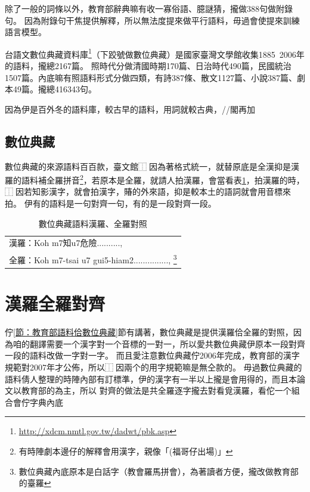 \documentclass[final,oneside,onecolumn,12pt,a4paper]{book}%
\begin{document}
除了一般的詞條以外，教育部辭典嘛有收一寡俗語、臆謎猜，攏做388句做附錄句。
因為附錄句干焦提供解釋，所以無法度提來做平行語料，毋過會使提來訓練語言模型。

台語文數位典藏資料庫\footnote{\url{http://xdcm.nmtl.gov.tw/dadwt/pbk.asp}}（下跤號做數位典藏）是國家臺灣文學館收集1885~2006年的語料，攏總2167篇。
照時代分做清國時期170篇、日治時代490篇，民國統治1507篇。內底嘛有照語料形式分做四類，有詩387條、散文1127篇、小說387篇、劇本49篇。攏總416343句。

因為伊是百外冬的語料庫，較古早的語料，用詞就較古典，//閣再加

\subsection{數位典藏}
\label{節：數位典藏}
數位典藏的來源語料百百款，臺文館⿰因為著格式統一，就替原底是全漢抑是漢羅的語料補全羅拼音\footnote{有時陣劇本邊仔的解釋會用漢字，親像「(福哥仔出場)」}，若原本是全羅，就請人拍漢羅，會當看表\ref{表：數位典藏語料}，拍漢羅的時，⿰因若知影漢字，就會拍漢字，賰的外來語，抑是較本土的語詞就會用音標來拍。
伊有的語料是一句對齊一句，有的是一段對齊一段。

\begin{table}
\caption{數位典藏語料漢羅、全羅對照}
\label{表：數位典藏語料}
\centering
\begin{tabular}{l}
漢羅：Koh m7知u7危險.........., \\
全羅：Koh m7-tsai u7 gui5-hiam2..............., \footnote{數位典藏內底原本是白話字（教會羅馬拼會），為著讀者方便，攏改做教育部的臺羅}\\
\end{tabular}
\end{table}


\section{漢羅全羅對齊}
\label{節：漢羅全羅對齊}
佇\ref{節：教育部語料佮數位典藏}節有講著，數位典藏是提供漢羅佮全羅的對照，因為咱的翻譯需要一个漢字對一个音標的一對一，所以愛共數位典藏伊原本一段對齊一段的語料改做一字對一字。
而且愛注意數位典藏佇2006年完成，教育部的漢字規範對2007年才公佈，所以⿰因兩个的用字規範嘛是無仝款的。
毋過數位典藏的語料倩人整理的時陣內部有訂標準，伊的漢字有一半以上攏是會用得的，而且本論文以教育部的為主，所以
對齊的做法是共全羅逐字攏去對看覓漢羅，看佗一个組合會佇字典內底



\end{document}
